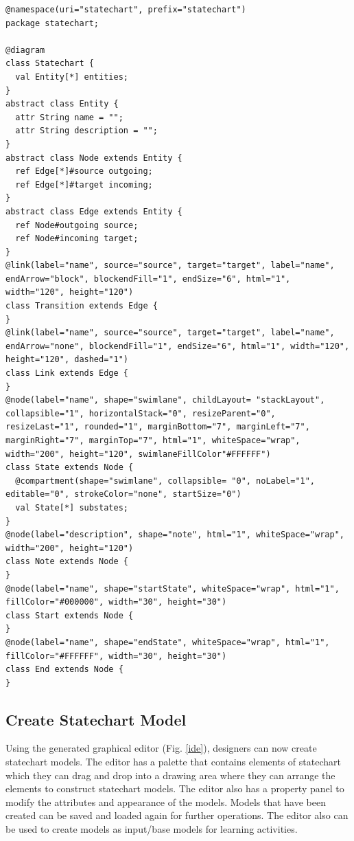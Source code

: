 \documentclass[conference]{IEEEtran}
\begin{document}
\begin{lstlisting}[style=interfaces,caption={A definition of statechart diagram using Emfatic and Eugenia-like annotations.},label=metamodel]
@namespace(uri="statechart", prefix="statechart")
package statechart;

@diagram
class Statechart {
  val Entity[*] entities;
}
abstract class Entity {
  attr String name = "";
  attr String description = "";
}
abstract class Node extends Entity {
  ref Edge[*]#source outgoing;
  ref Edge[*]#target incoming;
}
abstract class Edge extends Entity {
  ref Node#outgoing source;
  ref Node#incoming target;
}
@link(label="name", source="source", target="target", label="name", endArrow="block", blockendFill="1", endSize="6", html="1", width="120", height="120")
class Transition extends Edge {
}
@link(label="name", source="source", target="target", label="name", endArrow="none", blockendFill="1", endSize="6", html="1", width="120", height="120", dashed="1")
class Link extends Edge {
}
@node(label="name", shape="swimlane", childLayout= "stackLayout", collapsible="1", horizontalStack="0", resizeParent="0", resizeLast="1", rounded="1", marginBottom="7", marginLeft="7", marginRight="7", marginTop="7", html="1", whiteSpace="wrap", width="200", height="120", swimlaneFillColor"#FFFFFF")
class State extends Node {
  @compartment(shape="swimlane", collapsible= "0", noLabel="1", editable="0", strokeColor="none", startSize="0")
  val State[*] substates;
}
@node(label="description", shape="note", html="1", whiteSpace="wrap", width="200", height="120")
class Note extends Node {
}
@node(label="name", shape="startState", whiteSpace="wrap", html="1", fillColor="#000000", width="30", height="30")
class Start extends Node {
}
@node(label="name", shape="endState", whiteSpace="wrap", html="1", fillColor="#FFFFFF", width="30", height="30")
class End extends Node {
}
\end{lstlisting} 

\subsection{Create Statechart Model}
Using the generated graphical editor (Fig. \ref{ide}), designers can now create statechart models. The editor has a palette that contains elements of statechart which they can drag and drop into a drawing area where they can arrange the elements to construct statechart models. The editor also has a property panel to modify the attributes and appearance of the models. Models that have been created can be saved and loaded again for further operations. The editor also can be used to create models as input/base models for learning activities.        
\end{document}
